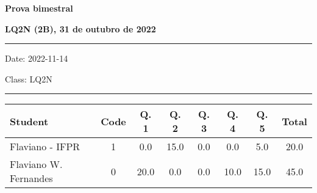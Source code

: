 \documentclass[12pt, addpoints]{exam}
\begin{document}
    \begin{minipage}[b]{0.75\linewidth}
        \begin{flushleft}
            {\bf \large Prova bimestral}
        \end{flushleft}
        \begin{flushleft}
            {\bf \large LQ2N (2B), 31 de outubro de 2022}
        \end{flushleft}
    \end{minipage}
    \vspace{0.5cm} \hrule \vspace{0.5cm}
    \begin{minipage}{0.70\linewidth}
        \begin{flushleft}
            Date: 2022-11-14
        \end{flushleft}
    \end{minipage}
    \begin{minipage}{0.25\linewidth}
        \begin{flushright}
            Class: LQ2N
        \end{flushright}
    \end{minipage}
    \vspace{0.5cm} \hrule \vspace{0.5cm}
    \begin{table}[h!]
\centering
\begin{tabular}{lccccccc}
\hline
Student & Code & Q. 1 & Q. 2 & Q. 3 & Q. 4 & Q. 5 & Total\\
\hline
Flaviano - IFPR & 1 & 0.0 & 15.0 & 0.0 & 0.0 & 5.0 & 20.0\\Flaviano W. Fernandes & 0 & 20.0 & 0.0 & 0.0 & 10.0 & 15.0 & 45.0\\\hline
\end{tabular}
\end{table}
\end{document}

